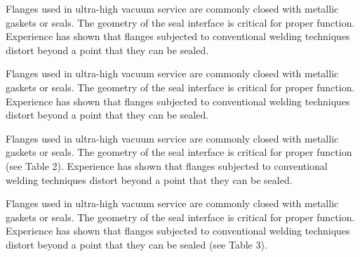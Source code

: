 \documentclass[11pt,letterpaper,twoside,english,final]{article}
\begin{document}
{Flanges used in ultra-high vacuum service are commonly closed with metallic gaskets or seals. The geometry of the seal interface is critical for proper function. Experience has shown that flanges subjected to conventional welding techniques distort beyond a point that they can be sealed.

Flanges used in ultra-high vacuum service are commonly closed with metallic gaskets or seals. The geometry of the seal interface is critical for proper function. Experience has shown that flanges subjected to conventional welding techniques distort beyond a point that they can be sealed.

Flanges used in ultra-high vacuum service are commonly closed with metallic gaskets or seals. The geometry of the seal interface is critical for proper function (see {\color{green}Table 2}). Experience has shown that flanges subjected to conventional welding techniques distort beyond a point that they can be sealed.

Flanges used in ultra-high vacuum service are commonly closed with metallic gaskets or seals. The geometry of the seal interface is critical for proper function. Experience has shown that flanges subjected to conventional welding techniques distort beyond a point that they can be sealed (see {\color{green}Table 3}).

}
\end{document}
